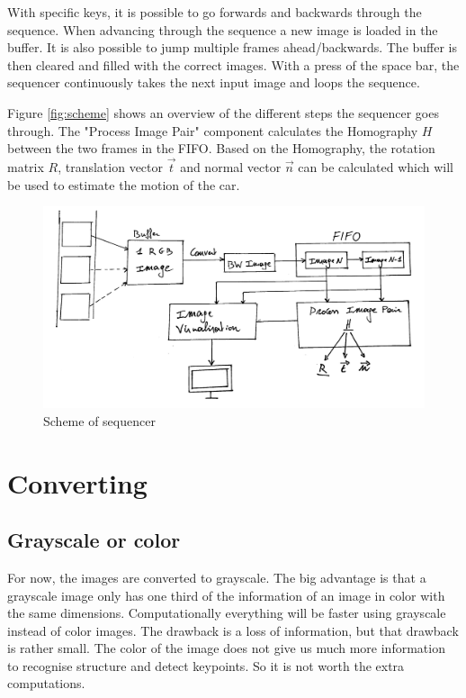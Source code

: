 With specific keys, it is possible to go forwards and backwards through the sequence. When advancing through the sequence a new image is loaded in the buffer. It is also possible to jump multiple frames ahead/backwards. The buffer is then cleared and filled with the correct images. With a press of the space bar, the sequencer continuously takes the next input image and loops the sequence.\bigskip

Figure \autoref{fig:scheme} shows an overview of the different steps the sequencer goes through. The "Process Image Pair" component calculates the Homography \underline{${H}$} between the two frames in the FIFO. Based on the Homography, the rotation matrix \underline{${R}$}, translation vector $\vec{t}$ and normal vector $\vec{n}$ can be calculated which will be used to estimate the motion of the car.

\begin{figure}
    \centering
    \includegraphics[width=1\textwidth]{figures/Block_diagram_sequencer.jpg}
    \caption{Scheme of sequencer}
    \label{fig:scheme}
\end{figure}

\section{Converting}
\subsection{Grayscale or color}
For now, the images are converted to grayscale. The big advantage is that a grayscale image only has one third of the information of an image in color with the same dimensions. Computationally everything will be faster using grayscale instead of color images. The drawback is a loss of information, but that drawback is rather small. The color of the image does not give us much more information to recognise structure and detect keypoints. So it is not worth the extra computations.\bigskip

